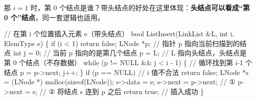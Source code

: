 \documentclass[10.5pt,a4paper,oneside]{article}
\newenvironment{Shaded}{}{}
\newcommand{\CommentTok}[1]{\textcolor[rgb]{0.18,0.55,0.23}{#1}}
\newcommand{\ControlFlowTok}[1]{\textcolor[rgb]{0.12,0.31,0.71}{#1}}
\newcommand{\DataTypeTok}[1]{\textcolor[rgb]{0.12,0.31,0.71}{#1}}
\newcommand{\DecValTok}[1]{\textcolor[rgb]{0.77,0.35,0.07}{#1}}
\newcommand{\KeywordTok}[1]{\textcolor[rgb]{0.12,0.31,0.71}{#1}}
\newcommand{\NormalTok}[1]{#1}
\newcommand{\OperatorTok}[1]{\textcolor[rgb]{0.20,0.20,0.20}{#1}}
\begin{document}
那 \(i=1\) 时，第 0
个结点是谁？带头结点的好处在这里体现：\textbf{头结点可以看成“第 0
个”结点}，同一套逻辑也适用。

\begin{Shaded}
\begin{Highlighting}[]
\CommentTok{// 在第 i 个位置插入元素 e（带头结点）}
\DataTypeTok{bool}\NormalTok{ ListInsert}\OperatorTok{(}\NormalTok{LinkList }\OperatorTok{\&}\NormalTok{L}\OperatorTok{,} \DataTypeTok{int}\NormalTok{ i}\OperatorTok{,}\NormalTok{ ElemType e}\OperatorTok{)} \OperatorTok{\{}
    \ControlFlowTok{if} \OperatorTok{(}\NormalTok{i }\OperatorTok{\textless{}} \DecValTok{1}\OperatorTok{)}
        \ControlFlowTok{return} \KeywordTok{false}\OperatorTok{;}
\NormalTok{    LNode }\OperatorTok{*}\NormalTok{p}\OperatorTok{;}        \CommentTok{// 指针 p 指向当前扫描到的结点}
    \DataTypeTok{int}\NormalTok{ j }\OperatorTok{=} \DecValTok{0}\OperatorTok{;}       \CommentTok{// 当前 p 指向的是第几个结点}
\NormalTok{    p }\OperatorTok{=}\NormalTok{ L}\OperatorTok{;}           \CommentTok{// L 指向头结点，头结点是第 0 个结点（不存数据）}
    \ControlFlowTok{while} \OperatorTok{(}\NormalTok{p }\OperatorTok{!=}\NormalTok{ NULL }\OperatorTok{\&\&}\NormalTok{ j }\OperatorTok{\textless{}}\NormalTok{ i }\OperatorTok{{-}} \DecValTok{1}\OperatorTok{)} \OperatorTok{\{}   \CommentTok{// 循环找到第 i{-}1 个结点}
\NormalTok{        p }\OperatorTok{=}\NormalTok{ p}\OperatorTok{{-}\textgreater{}}\NormalTok{next}\OperatorTok{;}
\NormalTok{        j}\OperatorTok{++;}
    \OperatorTok{\}}
    \ControlFlowTok{if} \OperatorTok{(}\NormalTok{p }\OperatorTok{==}\NormalTok{ NULL}\OperatorTok{)}   \CommentTok{// i 值不合法}
        \ControlFlowTok{return} \KeywordTok{false}\OperatorTok{;}
\NormalTok{    LNode }\OperatorTok{*}\NormalTok{s }\OperatorTok{=} \OperatorTok{(}\NormalTok{LNode }\OperatorTok{*)}\NormalTok{ malloc}\OperatorTok{(}\KeywordTok{sizeof}\OperatorTok{(}\NormalTok{LNode}\OperatorTok{));}
\NormalTok{    s}\OperatorTok{{-}\textgreater{}}\NormalTok{data }\OperatorTok{=}\NormalTok{ e}\OperatorTok{;}
\NormalTok{    s}\OperatorTok{{-}\textgreater{}}\NormalTok{next }\OperatorTok{=}\NormalTok{ p}\OperatorTok{{-}\textgreater{}}\NormalTok{next}\OperatorTok{;}   \CommentTok{// ①}
\NormalTok{    p}\OperatorTok{{-}\textgreater{}}\NormalTok{next }\OperatorTok{=}\NormalTok{ s}\OperatorTok{;}         \CommentTok{// ② 将结点 s 连到 p 之后}
    \ControlFlowTok{return} \KeywordTok{true}\OperatorTok{;}         \CommentTok{// 插入成功}
\OperatorTok{\}}
\end{Highlighting}
\end{Shaded}
\end{document}
